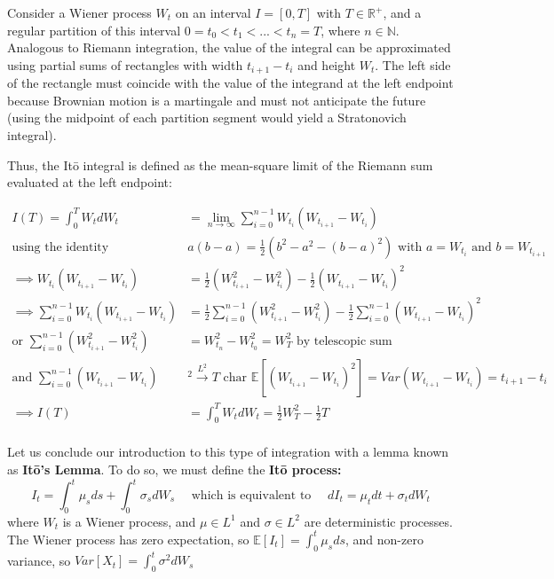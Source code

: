 Consider a Wiener process $W_t$ on an interval $I = [0, T]$ with $T \in \mathbb{R}^+$, and a regular partition of this interval $0=t_0<t_1<...<t_n=T$, where $n \in \mathbb{N}$. Analogous to Riemann integration, the value of the integral can be approximated using partial sums of rectangles with width $t_{i+1}-t_i$ and height $W_t$. The left side of the rectangle must coincide with the value of the integrand at the left endpoint because Brownian motion is a martingale and must not anticipate the future (using the midpoint of each partition segment would yield a Stratonovich integral). \\

\newpage

Thus, the Itō integral is defined as the mean-square limit of the Riemann sum evaluated at the left endpoint:

\begin{align*} 
    I(T) = \int_0^T W_tdW_t &= \lim_{n \to \infty} \sum_{i=0}^{n-1} W_{t_i}(W_{t_{i+1}}-W_{t_i})\\ 
    \text{using the identity }& a(b-a) = \frac{1}{2}(b^2-a^2-(b-a)^2) \text{ with } a = W_{t_i} \text{ and } b = W_{t_{i+1}}\\ 
    \implies W_{t_i}(W_{t_{i+1}}-W_{t_i}) &= \frac{1}{2}(W_{t_{i+1}}^2-W_{t_i}^2)-\frac{1}{2}(W_{t_{i+1}}-W_{t_i})^2 \\ 
    \implies \sum_{i=0}^{n-1} W_{t_i}(W_{t_{i+1}}-W_{t_i}) &= \frac{1}{2}\sum_{i=0}^{n-1}(W_{t_{i+1}}^2-W_{t_i}^2)-\frac{1}{2}\sum_{i=0}^{n-1}(W_{t_{i+1}}-W_{t_i})^2 \\ 
    \text{or }\sum_{i=0}^{n-1} (W_{t_{i+1}}^2 - W_{t_i}^2) &= W_{t_n}^2 - W_{t_0}^2 = W_T^2 \text{ by telescopic sum}\\ 
    \text{and }\sum_{i=0}^{n-1} (W_{t_{i+1}} - W_{t_i})&^2 \xrightarrow{L^2} T \text{ char } \mathbb{E}[(W_{t_{i+1}} - W_{t_i})^2] = Var(W_{t_{i+1}} - W_{t_i}) = t_{i+1} - t_i\\ 
    \implies I(T) &= \int_0^TW_tdW_t=\frac{1}{2}W_T^2-\frac{1}{2}T\\
\end{align*}

Let us conclude our introduction to this type of integration with a lemma known as \textbf{Itō's Lemma}.
To do so, we must define the \textbf{Itō process:}
\
$$I_t = \int_0^t \mu_sds+\int_0^t\sigma_sdW_s \quad\text{ which is equivalent to } \quad dI_t=\mu_tdt+\sigma_tdW_t$$ \cite{IntegraleDIto}
where $W_t$ is a Wiener process, and $\mu\in L^1$ and $\sigma\in L^2$ are deterministic processes. \\
\remark The Wiener process has zero expectation, so $\mathbb{E}[I_t]=\int_0^t\mu_sds$, and non-zero variance, so $Var[X_t]=\int_0^t\sigma^2dW_s$ \\

